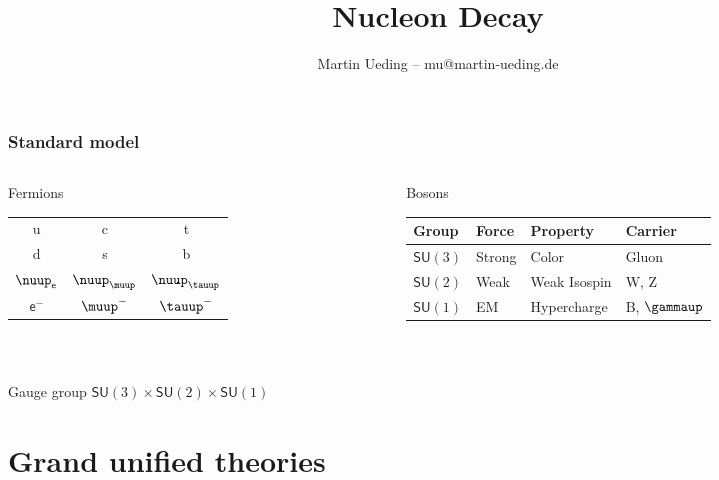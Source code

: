 \documentclass[english, fleqn]{beamer}
\title{Nucleon Decay}
\author{Martin Ueding -- mu@martin-ueding.de}
\begin{document}
\begin{frame}
    \titlepage
\end{frame}

\begin{frame}
    \frametitle{Standard model}

    \begin{columns}[t]
        \begin{column}{.3\linewidth}
            \begin{block}{Fermions}
                \

                \begin{tabular}{ccc}
                    u & c & t \\
                    d & s & b \\
                    \midrule
                    $\nuup_\mathsf e$ & $\nuup_\muup$ & $\nuup_\tauup$ \\
                    $\mathsf e^-$ & $ \muup^-$ & $\tauup^-$
                \end{tabular}
            \end{block}
        \end{column}
        \begin{column}{.7\linewidth}
            \begin{block}{Bosons}
                \

                \begin{tabular}{llll}
                    Group & Force & Property & Carrier \\
                    \midrule
                    $\mathsf{SU}(3)$ & Strong & Color & Gluon \\
                    $\mathsf{SU}(2)$ & Weak & Weak Isospin & W, Z \\
                    $\mathsf{SU}(1)$ & EM & Hypercharge & B, $\gammaup$
                \end{tabular}
            \end{block}
        \end{column}
    \end{columns}

    \

    \begin{block}{Gauge group}
        $\mathsf{SU}(3) \times \mathsf{SU}(2) \times \mathsf{SU}(1)$
    \end{block}

\end{frame}

\section{Grand unified theories}
\end{document}
